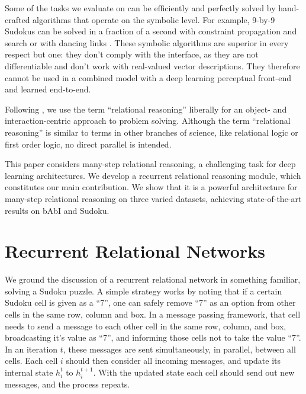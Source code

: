 \documentclass{article}
\newcommand{\rbp}[1]{

}
\newcommand{\ulrich}[1]{

}
\begin{document}
Some of the tasks we evaluate on can be efficiently and perfectly solved by hand-crafted algorithms that operate on the symbolic level. For example, 9-by-9 Sudokus can be solved in a fraction of a second with constraint propagation and search \citep{norvig2006solving} or with dancing links \citep{knuth2000dancing}. These symbolic algorithms are superior in every respect but one: they don't comply with the interface, as they are not differentiable and don't work with real-valued vector descriptions. They therefore cannot be used in a combined model with a deep learning perceptual front-end and learned end-to-end. %

Following \cite{santoro2017simple}, we use the term ``relational reasoning'' liberally for an object- and interaction-centric approach to problem solving. Although the term ``relational reasoning'' is similar to terms in other branches of science, like relational logic or first order logic, no direct parallel is intended.

This paper considers many-step relational reasoning, a challenging task for deep learning architectures.
We develop a recurrent relational reasoning module, which constitutes our main contribution.
We show that it is a powerful architecture for many-step relational reasoning on three varied datasets, achieving state-of-the-art results on bAbI and Sudoku.

\section{Recurrent Relational Networks}

We ground the discussion of a recurrent relational network in something familiar, solving a Sudoku puzzle.
A simple strategy works by
noting that if a certain Sudoku cell is given as a
``7'', one can safely remove ``7'' as an option from other cells in the same row, column and box.
In a message passing framework,
that cell needs to send a message to each other cell in the same row, column, and box,
broadcasting it's value as ``7'', and informing those cells not to take the value ``7''.
In an iteration $t$, these messages are sent simultaneously, in parallel, between all cells.
Each cell $i$ should then consider all incoming messages, and update its internal state $h_i^t$ to $h_i^{t+1}$.
With the updated state each cell should send out new messages, and the process repeats.
\end{document}
